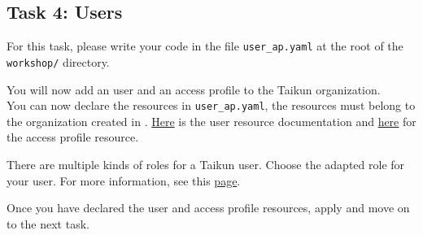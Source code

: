 \subsection{Task 4: Users}\label{sec:user_ap}

\begin{note}
For this task, please write your code in the file \texttt{user\_ap.yaml}
at the root of the \texttt{workshop/} directory.
\end{note}

You will now add an user and an access profile to the Taikun organization.\\

You can now declare the resources in \texttt{user\_ap.yaml}, the resources must belong to the organization created in .
\href{https://doc.crds.dev/github.com/itera-io/provider-jet-taikun/user.taikun.jet.crossplane.io/User/v1alpha1}{Here} is the user resource documentation and \href{https://doc.crds.dev/github.com/itera-io/provider-jet-taikun/accessprofile.taikun.jet.crossplane.io/Profile/v1alpha1}{here} for the access profile resource.

\begin{note}
There are multiple kinds of roles for a Taikun user. Choose the adapted role for your user.
For more information, see this \href{https://taikun.cloud/docs/user/}{page}.
\end{note}



Once you have declared the user and access profile resources, apply and move on to the next task.
